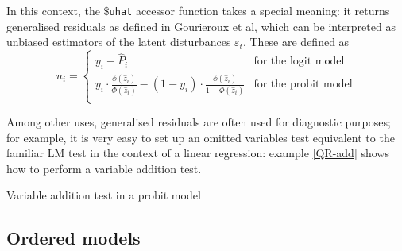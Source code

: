 In this context, the \texttt{$\$$uhat} accessor function
takes a special meaning: it returns generalised residuals as defined
in Gourieroux et al, which can be interpreted as unbiased estimators
of the latent disturbances $\varepsilon_t$. These are defined as
\begin{equation}
  \label{eq:QR-genres}
  u_i = \left\{
    \begin{array}{ll}
      y_i - \hat{P}_i & \textrm{for the logit model} \\
      y_i\cdot \frac{\phi(\hat{z}_i)}{\Phi(\hat{z}_i)} - 
      ( 1 - y_i ) \cdot \frac{\phi(\hat{z}_i)}{1 - \Phi(\hat{z}_i)}
      & \textrm{for the probit model} \\
    \end{array}
    \right.
\end{equation}

Among other uses, generalised residuals are often used for diagnostic
purposes; for example, it is very easy to set up an omitted variables
test equivalent to the familiar LM test in the context of a linear
regression: example \ref{QR-add} shows how to perform a variable
addition test.

\begin{script}[htbp]
  \caption{Variable addition test in a probit model}
  \label{QR-add}
\end{script}

\subsection{Ordered models}
\label{sec:ordered}

